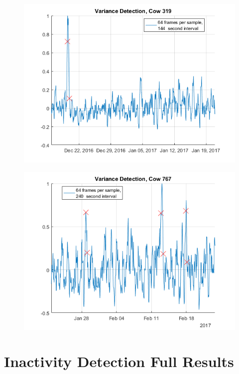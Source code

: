 \begin{figure}[htb]
\centering
\includegraphics[width = 0.75 \textwidth]{figures/VarianceDetectionCow319_64frames144seconds.png}
\caption{}
\label{}
\end{figure}

\begin{figure}[h]
\centering
\includegraphics[width = 0.75 \textwidth]{figures/VarianceDetectionCow767_64frames240seconds.png}
\caption{}
\label{}
\end{figure}


\clearpage
\section{Inactivity Detection Full Results}


